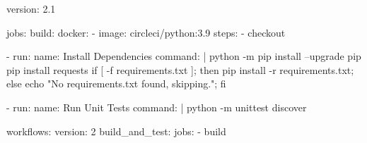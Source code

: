 version: 2.1

jobs:
  build:
    docker:
      - image: circleci/python:3.9
    steps:
      - checkout
      
      - run:
          name: Install Dependencies
          command: |
            python -m pip install --upgrade pip
            pip install requests
            if [ -f requirements.txt ]; then pip install -r requirements.txt; else echo "No requirements.txt found, skipping."; fi

      - run:
          name: Run Unit Tests
          command: |
            python -m unittest discover

workflows:
  version: 2
  build_and_test:
    jobs:
      - build



